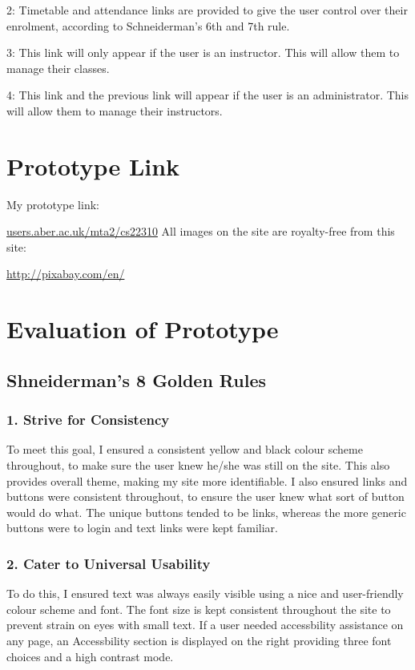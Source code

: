 \documentclass[11pt, article]{article}
\begin{document}
	2: Timetable and attendance links are provided to give the user control over their enrolment, according to Schneiderman's 6th and 7th rule.
	
	3: This link will only appear if the user is an instructor. This will allow them to manage their classes.
	
	4: This link and the previous link will appear if the user is an administrator. This will allow them to manage their instructors.

\section{Prototype Link}
My prototype link:

\url{users.aber.ac.uk/mta2/cs22310}
\newline \newline
All images on the site are royalty-free from this site:

\url{http://pixabay.com/en/}



	\section{Evaluation of Prototype}
	\subsection{Shneiderman's 8 Golden Rules}
	\subsubsection{1. Strive for Consistency}
	To meet this goal, I ensured a consistent yellow and black colour scheme throughout, to make sure the user knew he/she was still on the site. This also provides overall theme, making my site more identifiable. I also ensured links and buttons were consistent throughout, to ensure the user knew what sort of button would do what. The unique buttons tended to be links, whereas the more generic buttons were to login and text links were kept familiar.
	\subsubsection{2. Cater to Universal Usability}
	To do this, I ensured text was always easily visible using a nice and user-friendly colour scheme and font. The font size is kept consistent throughout the site to prevent strain on eyes with small text. If a user needed accessbility assistance on any page, an Accessbility section is displayed on the right providing three font choices and a high contrast mode. 
	
\end{document}
